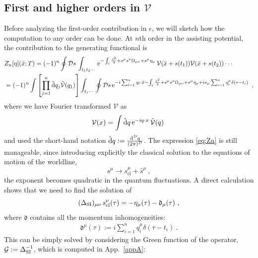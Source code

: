 \documentclass[12pt,a4paper]{article}
\numberwithin{equation}{section}
\numberwithin{equation}{section}
\begin{document}
\subsection{First and higher orders in $\mathcal{V}$} \label{sec3.4.2}
Before analyzing the first-order contribution in $\epsilon$, we will sketch how the computation to any order can be done. 
At $n$th order in the assisting potential, the contribution to the generating functional is
\begin{align}\label{eq:Zn}
\begin{split}
&Z_n[\eta](\bar{x};T)=(-1)^n\oint \mathcal{D}s \, \int_{t_1 t_2\cdots}\, \mathrm{e}^{-\int_t \frac{\dot{s}^2}{4}+ s^\mu s^\nu \Omega_{\mu\nu}+s^\mu\eta_\mu} \, \mathcal{V}(\bar{x}+s(t_1))\mathcal{V}(\bar{x}+s(t_2))\cdots
\\
&=(-1)^n\int \left[\prod_{j=1}^n \hat{\rm d}q_j \tilde{\mathcal{V}}(q_1) \right] 
\int_{t_1\cdots}\, \oint \mathcal{D}s \, \mathrm{e}^{-i \sum_{l=1}^n q_l \cdot \bar{x}-\int_t \frac{\dot{s}^2}{4}+s^\mu s^\nu \Omega_{\mu\nu}+s^\mu\eta_\mu+is_\mu\sum_{i=1}^n q_i^\mu \delta(\tau-t_i)} \, \ ,
\end{split}
\end{align}
where we have Fourier transformed $\mathcal{V}$ as
\begin{equation} \label{FT}
\mathcal{V}(x)=\int\hat{\rm d}q \, \mathrm{e}^{-i q \cdot x } \, \tilde{\mathcal{V}}(q)\ 
\end{equation}
and used the short-hand notation $\hat{\rm d}q:=\frac{{\rm d}^Dq}{(2\pi)^D}$. 
The expression \eqref{eq:Zn} is still manageable, since introducing explicitly the classical solution to the equations of motion of the worldline,
\begin{equation} \label{eq:}
s^\mu \to s^\mu_{\mathrm{cl}} + \hat{s}^\mu\ ,
\end{equation}
the exponent becomes quadratic in the quantum fluctuations.
A direct calculation shows that we need to find the solution of
\begin{equation}
(\Delta_{\rm SI})_{\mu\nu} \, s_{\mathrm{cl}}^\nu(\tau)=-\eta_\mu(\tau)-\mathfrak{d}_\mu(\tau)\ ,
\end{equation}
where $\mathfrak{d}$ contains all the momentum inhomogeneities:
\begin{align}
 \mathfrak{d}^\mu(\tau):= i \sum_{i=1}^n q^\mu_i\delta(\tau-t_i)\ .
\end{align}
This can be simply solved by considering the Green function of the operator, $\mathcal{G}:=\Delta_{\rm SI}^{-1}$, which is computed in App.~\ref{appA}:
\end{document}
